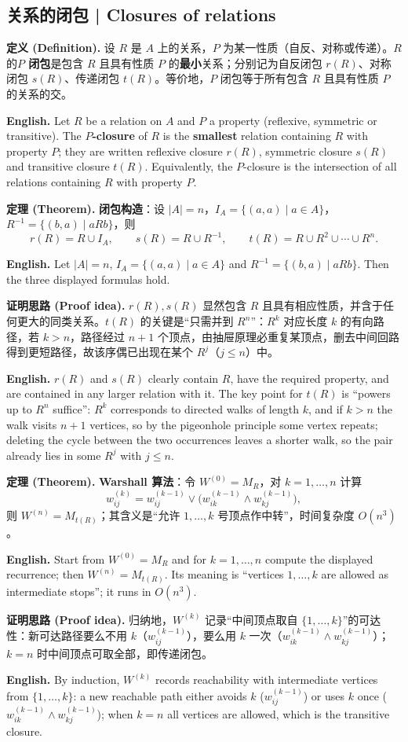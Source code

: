 \documentclass[UTF8,11pt,a4paper]{ctexart}
\newcommand{\EN}[1]{\par\noindent \textbf{English.} #1\par}
\newcommand{\DEF}[2]{\par\noindent\textbf{定义 (Definition).} #1\par\EN{#2}}
\newcommand{\THM}[2]{\par\noindent\textbf{定理 (Theorem).} #1\par\EN{#2}}
\newcommand{\PRF}[2]{\par\noindent\textbf{证明思路 (Proof idea).} #1\par\EN{#2}}
\begin{document}
\subsection{关系的闭包 | Closures of relations}
\DEF{设 $R$ 是 $A$ 上的关系，$P$ 为某一性质（自反、对称或传递）。$R$ 的\textbf{$P$ 闭包}是包含 $R$ 且具有性质 $P$ 的\textbf{最小}关系；分别记为自反闭包 $r(R)$、对称闭包 $s(R)$、传递闭包 $t(R)$。等价地，$P$ 闭包等于所有包含 $R$ 且具有性质 $P$ 的关系的交。}{Let $R$ be a relation on $A$ and $P$ a property (reflexive, symmetric or transitive). The \textbf{$P$-closure} of $R$ is the \textbf{smallest} relation containing $R$ with property $P$; they are written reflexive closure $r(R)$, symmetric closure $s(R)$ and transitive closure $t(R)$. Equivalently, the $P$-closure is the intersection of all relations containing $R$ with property $P$.}
\THM{\textbf{闭包构造}：设 $|A|=n$，$I_A=\{(a,a)\mid a\in A\}$，$R^{-1}=\{(b,a)\mid aRb\}$，则
\[
r(R)=R\cup I_A,\qquad s(R)=R\cup R^{-1},\qquad t(R)=R\cup R^2\cup\cdots\cup R^n .
\]
}{Let $|A|=n$, $I_A=\{(a,a)\mid a\in A\}$ and $R^{-1}=\{(b,a)\mid aRb\}$. Then the three displayed formulas hold.}
\PRF{$r(R),s(R)$ 显然包含 $R$ 且具有相应性质，并含于任何更大的同类关系。$t(R)$ 的关键是“只需并到 $R^n$”：$R^k$ 对应长度 $k$ 的有向路径，若 $k>n$，路径经过 $n+1$ 个顶点，由抽屉原理必重复某顶点，删去中间回路得到更短路径，故该序偶已出现在某个 $R^j$（$j\le n$）中。}{$r(R)$ and $s(R)$ clearly contain $R$, have the required property, and are contained in any larger relation with it. The key point for $t(R)$ is ``powers up to $R^n$ suffice'': $R^k$ corresponds to directed walks of length $k$, and if $k>n$ the walk visits $n+1$ vertices, so by the pigeonhole principle some vertex repeats; deleting the cycle between the two occurrences leaves a shorter walk, so the pair already lies in some $R^j$ with $j\le n$.}
\THM{\textbf{Warshall 算法}：令 $W^{(0)}=M_R$，对 $k=1,\dots,n$ 计算
\[
w_{ij}^{(k)}=w_{ij}^{(k-1)}\vee\bigl(w_{ik}^{(k-1)}\wedge w_{kj}^{(k-1)}\bigr),
\]
则 $W^{(n)}=M_{t(R)}$；其含义是“允许 $1,\dots,k$ 号顶点作中转”，时间复杂度 $O(n^3)$。}{Start from $W^{(0)}=M_R$ and for $k=1,\dots,n$ compute the displayed recurrence; then $W^{(n)}=M_{t(R)}$. Its meaning is ``vertices $1,\dots,k$ are allowed as intermediate stops''; it runs in $O(n^3)$.}
\PRF{归纳地，$W^{(k)}$ 记录“中间顶点取自 $\{1,\dots,k\}$”的可达性：新可达路径要么不用 $k$（$w_{ij}^{(k-1)}$），要么用 $k$ 一次（$w_{ik}^{(k-1)}\wedge w_{kj}^{(k-1)}$）；$k=n$ 时中间顶点可取全部，即传递闭包。}{By induction, $W^{(k)}$ records reachability with intermediate vertices from $\{1,\dots,k\}$: a new reachable path either avoids $k$ ($w_{ij}^{(k-1)}$) or uses $k$ once ($w_{ik}^{(k-1)}\wedge w_{kj}^{(k-1)}$); when $k=n$ all vertices are allowed, which is the transitive closure.}
\end{document}

